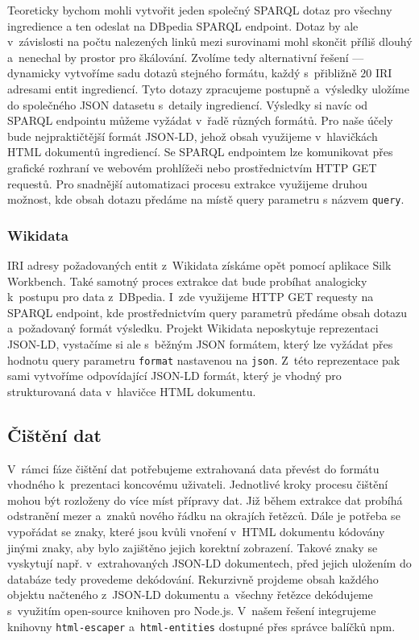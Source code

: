 Teoreticky bychom mohli vytvořit jeden společný SPARQL dotaz pro všechny ingredience a ten odeslat na DBpedia SPARQL endpoint. Dotaz by ale v~závislosti na počtu nalezených linků mezi surovinami mohl skončit příliš dlouhý a~nenechal by prostor pro škálování. Zvolíme tedy alternativní řešení --- dynamicky vytvoříme sadu dotazů stejného formátu, každý s~přibližně $20$ IRI adresami entit ingrediencí. Tyto dotazy zpracujeme postupně a~výsledky uložíme do společného JSON datasetu s~detaily ingrediencí. Výsledky si navíc od SPARQL endpointu můžeme vyžádat v~řadě různých formátů. Pro naše účely bude nejpraktičtější formát JSON-LD, jehož obsah využijeme v~hlavičkách HTML dokumentů ingrediencí. Se SPARQL endpointem lze komunikovat přes grafické rozhraní ve webovém prohlížeči nebo prostřednictvím HTTP GET requestů. Pro snadnější automatizaci procesu extrakce využijeme druhou možnost, kde obsah dotazu předáme na místě query parametru s názvem \texttt{query}.

\subsubsection{Wikidata}

IRI adresy požadovaných entit z~Wikidata získáme opět pomocí aplikace Silk Workbench. Také samotný proces extrakce dat bude probíhat analogicky k~postupu pro data z~DBpedia. I~zde využijeme HTTP GET requesty na SPARQL endpoint, kde prostřednictvím query parametrů předáme obsah dotazu a~požadovaný formát výsledku. Projekt Wikidata neposkytuje reprezentaci JSON-LD, vystačíme si ale s~běžným JSON formátem, který lze vyžádat přes hodnotu query parametru \texttt{format} nastavenou na \texttt{json}. Z~této reprezentace pak sami vytvoříme odpovídající JSON-LD formát, který je vhodný pro strukturovaná data v~hlavičce HTML dokumentu.

\subsection{Čištění dat}

V~rámci fáze čištění dat potřebujeme extrahovaná data převést do formátu vhodného k~prezentaci koncovému uživateli. Jednotlivé kroky procesu čištění mohou být rozloženy do více míst přípravy dat. Již během extrakce dat probíhá odstranění mezer a~znaků nového řádku na okrajích řetězců. Dále je potřeba se vypořádat se znaky, které jsou kvůli vnoření v~HTML dokumentu kódovány jinými znaky, aby bylo zajištěno jejich korektní zobrazení. Takové znaky se vyskytují např. v~extrahovaných JSON-LD dokumentech, před jejich uložením do databáze tedy provedeme dekódování. Rekurzivně projdeme obsah každého objektu načteného z~JSON-LD dokumentu a~všechny řetězce dekódujeme s~využitím open-source knihoven pro Node.js. V~našem řešení integrujeme knihovny \texttt{html-escaper} a~\texttt{html-entities} dostupné přes správce balíčků npm.

